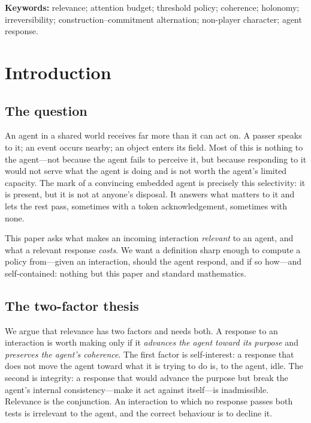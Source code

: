 \documentclass[11pt,twocolumn,a4paper]{article}
\begin{document}
\vspace{0.5em}
\noindent\textbf{Keywords:} relevance; attention budget; threshold policy;
coherence; holonomy; irreversibility; construction--commitment
alternation; non-player character; agent response.

\section{Introduction}
\label{sec:intro}

\subsection{The question}

An agent in a shared world receives far more than it can act on. A passer
speaks to it; an event occurs nearby; an object enters its field. Most of
this is nothing to the agent---not because the agent fails to perceive it,
but because responding to it would not serve what the agent is doing and
is not worth the agent's limited capacity. The mark of a convincing
embedded agent is precisely this selectivity: it is present, but it is not
at anyone's disposal. It answers what matters to it and lets the rest
pass, sometimes with a token acknowledgement, sometimes with none.

This paper asks what makes an incoming interaction \emph{relevant} to an
agent, and what a relevant response \emph{costs}. We want a definition
sharp enough to compute a policy from---given an interaction, should the
agent respond, and if so how---and self-contained: nothing but this paper
and standard mathematics.

\subsection{The two-factor thesis}

We argue that relevance has two factors and needs both. A response to an
interaction is worth making only if it \emph{advances the agent toward its
purpose} and \emph{preserves the agent's coherence}. The first factor is
self-interest: a response that does not move the agent toward what it is
trying to do is, to the agent, idle. The second is integrity: a response
that would advance the purpose but break the agent's internal
consistency---make it act against itself---is inadmissible. Relevance is
the conjunction. An interaction to which no response passes both tests is
irrelevant to the agent, and the correct behaviour is to decline it.
\end{document}
